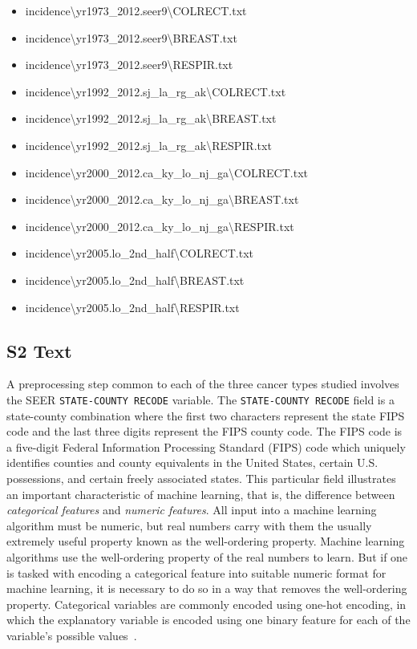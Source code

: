 \documentclass[10pt,letterpaper]{article}
\newcommand{\codewhite}[1]{\colorbox{white}{\texttt{#1}}}
\begin{document}
\begin{itemize}[noitemsep]
\item incidence\textbackslash yr1973\_2012.seer9\textbackslash COLRECT.txt
\item incidence\textbackslash yr1973\_2012.seer9\textbackslash BREAST.txt
\item incidence\textbackslash yr1973\_2012.seer9\textbackslash RESPIR.txt
\item incidence\textbackslash yr1992\_2012.sj\_la\_rg\_ak\textbackslash COLRECT.txt
\item incidence\textbackslash yr1992\_2012.sj\_la\_rg\_ak\textbackslash BREAST.txt
\item incidence\textbackslash yr1992\_2012.sj\_la\_rg\_ak\textbackslash RESPIR.txt
\item incidence\textbackslash yr2000\_2012.ca\_ky\_lo\_nj\_ga\textbackslash COLRECT.txt
\item incidence\textbackslash yr2000\_2012.ca\_ky\_lo\_nj\_ga\textbackslash BREAST.txt
\item incidence\textbackslash yr2000\_2012.ca\_ky\_lo\_nj\_ga\textbackslash RESPIR.txt
\item incidence\textbackslash yr2005.lo\_2nd\_half\textbackslash COLRECT.txt
\item incidence\textbackslash yr2005.lo\_2nd\_half\textbackslash BREAST.txt
\item incidence\textbackslash yr2005.lo\_2nd\_half\textbackslash RESPIR.txt
\end{itemize}

\subsection*{S2 Text}
\label{S2_Text}

A preprocessing step common to each of the three cancer types studied involves the SEER \codewhite{STATE-COUNTY RECODE} variable.
The \codewhite{STATE-COUNTY RECODE} field is a state-county combination where the first two characters represent the state FIPS code and the last three digits represent the FIPS county code.  The FIPS code is a five-digit Federal Information Processing Standard (FIPS) code which uniquely identifies counties and county equivalents in the United States, certain U.S. possessions, and certain freely associated states.
This particular field illustrates an important characteristic of machine learning, that is, the difference  between \textit{categorical features} and \textit{numeric features}. All input into a machine learning algorithm must be numeric, but real numbers carry with them the usually extremely useful property known as the well-ordering property. Machine learning algorithms use the well-ordering property of the real numbers to learn.
But if one is tasked with encoding a categorical feature into suitable numeric format for machine learning, it is necessary to do so in a way that removes the well-ordering property. Categorical variables are commonly encoded using one-hot encoding, in which the explanatory variable is encoded using one binary feature for each of the variable's possible values~\cite{bowles}.
\end{document}
